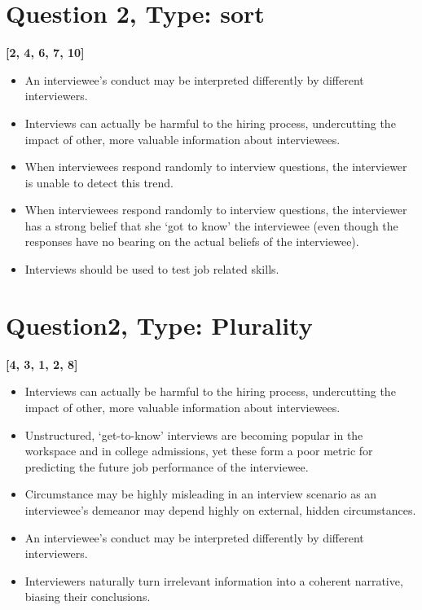 \documentclass[10pt]{article}
\begin{document}
\section{Question 2, Type: sort}
\textbf{[2, 4, 6, 7, 10]}
\begin{itemize}
\item An interviewee's conduct may be interpreted differently by different interviewers.
\item Interviews can actually be harmful to the hiring process, undercutting the impact of other, more valuable information about interviewees.
\item When interviewees respond randomly to interview questions, the interviewer is unable to detect this trend.
\item When interviewees respond randomly to interview questions, the interviewer has a strong belief that she `got to know' the interviewee (even though the responses have no bearing on the actual beliefs of the interviewee).
\item Interviews should be used to test job related skills.
\end{itemize}


\section{Question2, Type: Plurality}
\textbf{[4, 3, 1, 2, 8]}
\begin{itemize}
\item Interviews can actually be harmful to the hiring process, undercutting the impact of other, more valuable information about interviewees.
\item Unstructured, `get-to-know' interviews are becoming popular in the workspace and in college admissions, yet these form a poor metric for predicting the future job performance of the interviewee.
\item Circumstance may be highly misleading in an interview scenario as an interviewee's demeanor may depend highly on external, hidden circumstances.
\item An interviewee's conduct may be interpreted differently by different interviewers.
\item Interviewers naturally turn irrelevant information into a coherent narrative, biasing their conclusions.
\end{itemize}
\end{document}
